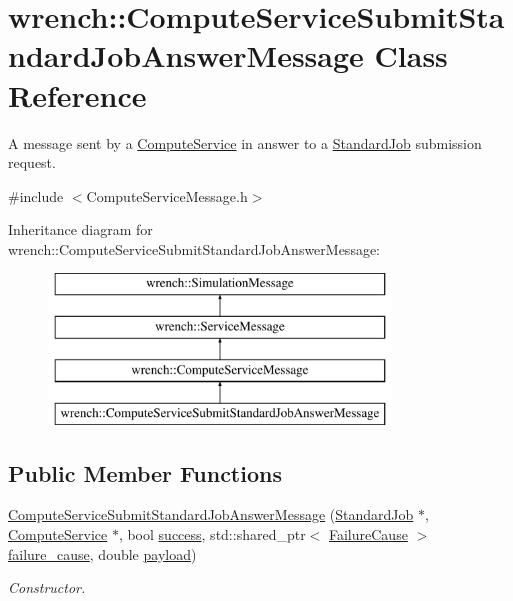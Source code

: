 \hypertarget{classwrench_1_1_compute_service_submit_standard_job_answer_message}{}\section{wrench\+:\+:Compute\+Service\+Submit\+Standard\+Job\+Answer\+Message Class Reference}
\label{classwrench_1_1_compute_service_submit_standard_job_answer_message}


A message sent by a \hyperlink{classwrench_1_1_compute_service}{Compute\+Service} in answer to a \hyperlink{classwrench_1_1_standard_job}{Standard\+Job} submission request.  




{\ttfamily \#include $<$Compute\+Service\+Message.\+h$>$}

Inheritance diagram for wrench\+:\+:Compute\+Service\+Submit\+Standard\+Job\+Answer\+Message\+:\begin{figure}[H]
\begin{center}
\leavevmode
\includegraphics[height=4.000000cm]{classwrench_1_1_compute_service_submit_standard_job_answer_message}
\end{center}
\end{figure}
\subsection*{Public Member Functions}
\begin{DoxyCompactItemize}
\item 
\hyperlink{classwrench_1_1_compute_service_submit_standard_job_answer_message_adf8c3914db94b1d9a8e346cc1369182f}{Compute\+Service\+Submit\+Standard\+Job\+Answer\+Message} (\hyperlink{classwrench_1_1_standard_job}{Standard\+Job} $\ast$, \hyperlink{classwrench_1_1_compute_service}{Compute\+Service} $\ast$, bool \hyperlink{classwrench_1_1_compute_service_submit_standard_job_answer_message_a0cbc290754685f5a05beb6e1f07cc292}{success}, std\+::shared\+\_\+ptr$<$ \hyperlink{classwrench_1_1_failure_cause}{Failure\+Cause} $>$ \hyperlink{classwrench_1_1_compute_service_submit_standard_job_answer_message_a34bd4f67111bbec0382e8c5de9391893}{failure\+\_\+cause}, double \hyperlink{classwrench_1_1_simulation_message_a914f2732713f7c02898e66f05a7cb8a1}{payload})
\begin{DoxyCompactList}\small\item\em Constructor. \end{DoxyCompactList}\end{DoxyCompactItemize}
